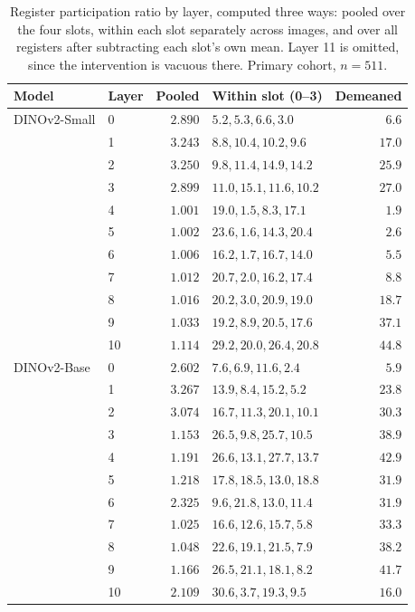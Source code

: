 \documentclass{article}
\begin{document}
\begin{table}[h]
\centering
\caption{Register participation ratio by layer, computed three ways: pooled over the four slots, within each slot separately across images, and over all registers after subtracting each slot's own mean. Layer 11 is omitted, since the intervention is vacuous there. Primary cohort, $n=511$.}
\label{tab:slots}
\footnotesize
\setlength{\tabcolsep}{5pt}
\begin{tabular}{llrlr}
\toprule
Model & Layer & Pooled & Within slot (0--3) & Demeaned \\
\midrule
DINOv2-Small & 0 & $2.890$ & $5.2, 5.3, 6.6, 3.0$ & $6.6$ \\
 & 1 & $3.243$ & $8.8, 10.4, 10.2, 9.6$ & $17.0$ \\
 & 2 & $3.250$ & $9.8, 11.4, 14.9, 14.2$ & $25.9$ \\
 & 3 & $2.899$ & $11.0, 15.1, 11.6, 10.2$ & $27.0$ \\
 & 4 & $1.001$ & $19.0, 1.5, 8.3, 17.1$ & $1.9$ \\
 & 5 & $1.002$ & $23.6, 1.6, 14.3, 20.4$ & $2.6$ \\
 & 6 & $1.006$ & $16.2, 1.7, 16.7, 14.0$ & $5.5$ \\
 & 7 & $1.012$ & $20.7, 2.0, 16.2, 17.4$ & $8.8$ \\
 & 8 & $1.016$ & $20.2, 3.0, 20.9, 19.0$ & $18.7$ \\
 & 9 & $1.033$ & $19.2, 8.9, 20.5, 17.6$ & $37.1$ \\
 & 10 & $1.114$ & $29.2, 20.0, 26.4, 20.8$ & $44.8$ \\
\midrule
DINOv2-Base & 0 & $2.602$ & $7.6, 6.9, 11.6, 2.4$ & $5.9$ \\
 & 1 & $3.267$ & $13.9, 8.4, 15.2, 5.2$ & $23.8$ \\
 & 2 & $3.074$ & $16.7, 11.3, 20.1, 10.1$ & $30.3$ \\
 & 3 & $1.153$ & $26.5, 9.8, 25.7, 10.5$ & $38.9$ \\
 & 4 & $1.191$ & $26.6, 13.1, 27.7, 13.7$ & $42.9$ \\
 & 5 & $1.218$ & $17.8, 18.5, 13.0, 18.8$ & $31.9$ \\
 & 6 & $2.325$ & $9.6, 21.8, 13.0, 11.4$ & $31.9$ \\
 & 7 & $1.025$ & $16.6, 12.6, 15.7, 5.8$ & $33.3$ \\
 & 8 & $1.048$ & $22.6, 19.1, 21.5, 7.9$ & $38.2$ \\
 & 9 & $1.166$ & $26.5, 21.1, 18.1, 8.2$ & $41.7$ \\
 & 10 & $2.109$ & $30.6, 3.7, 19.3, 9.5$ & $16.0$ \\
\bottomrule
\end{tabular}
\end{table}
\end{document}
